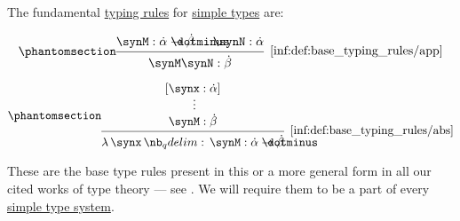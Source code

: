 \begin{definition}\label{def:base_typing_rules}
  The fundamental \hyperref[def:type_derivation_tree]{typing rules} for \hyperref[def:simple_type]{simple types} are:
  \begin{paracol}{2}
    \begin{leftcolumn}
      \begin{equation*}\taglabel[\ensuremath{ \logic{App} }]{inf:def:base_typing_rules/app}
        \begin{prooftree}
          \hypo{ \synM: \syn\alpha \synimplies \syn\beta }
          \hypo{ \synN: \syn\alpha }
          \infer2[\ref{inf:def:base_typing_rules/app}]{ \synM \synN: \syn\beta }
        \end{prooftree}
      \end{equation*}
    \end{leftcolumn}

    \begin{rightcolumn}
      \begin{equation*}\taglabel[\ensuremath{ \logic{Abs} }]{inf:def:base_typing_rules/abs}
        \begin{prooftree}
          \hypo{ [\synx: \syn\alpha] }
          \ellipsis {} { \synM: \syn\beta }
          \infer1[\ref{inf:def:base_typing_rules/abs}]{ \qabs \synx \synM: \syn\alpha \synimplies \syn\beta }
        \end{prooftree}
      \end{equation*}
    \end{rightcolumn}
  \end{paracol}
\end{definition}
\begin{comments}
  \item These are the base type rules present in this or a more general form in all our cited works of type theory --- see . We will require them to be a part of every \hyperref[def:simple_type_system]{simple type system}.
\end{comments}


